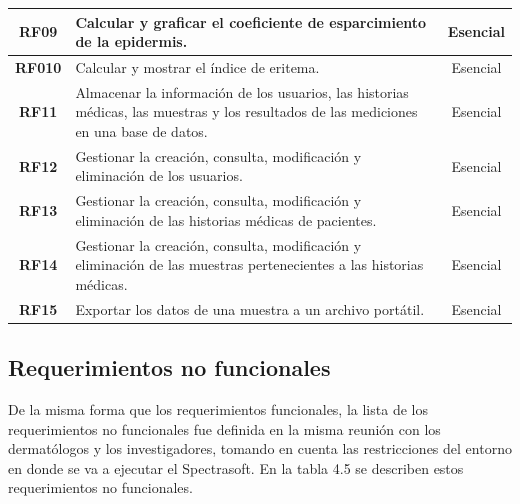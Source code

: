 \begin{table}[h]
\begin{tabulary}{\anchotabla}{|c|J|c|}
			\textbf{RF09} & Calcular y graficar el coeficiente de esparcimiento de la epidermis. & Esencial\\ \hline

			\textbf{RF010} & Calcular y mostrar el \'{i}ndice de eritema. & Esencial\\ \hline

			\textbf{RF11} & Almacenar la informaci\'{o}n de los usuarios, las historias m\'{e}dicas, las muestras y los resultados de las mediciones en una base de datos. & Esencial\\ \hline			

			\textbf{RF12} & Gestionar la creaci\'{o}n, consulta, modificaci\'{o}n y eliminaci\'{o}n de los usuarios. & Esencial\\ \hline
			
			\textbf{RF13} & Gestionar la creaci\'{o}n, consulta, modificaci\'{o}n y eliminaci\'{o}n de las historias m\'{e}dicas de pacientes. & Esencial\\ \hline
			
			\textbf{RF14} & Gestionar la creaci\'{o}n, consulta, modificaci\'{o}n y eliminaci\'{o}n de las muestras pertenecientes a las historias m\'{e}dicas. & Esencial\\ \hline	
			
			\textbf{RF15} & Exportar los datos de una muestra a un archivo port\'{a}til. & Esencial\\ \hline
		\end{tabulary}
	\end{table}
	
\subsection{Requerimientos no funcionales}
	
	De la misma forma que los requerimientos funcionales, la lista de los requerimientos no funcionales fue definida en la misma reuni\'{o}n con los dermat\'{o}logos y los investigadores, tomando en cuenta las restricciones del entorno en donde se va a ejecutar el Spectrasoft. En la tabla 4.5 se describen estos requerimientos no funcionales.
	
